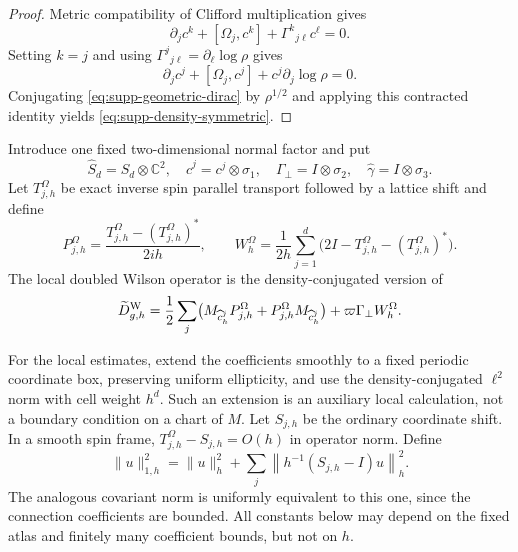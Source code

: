 \documentclass[11pt]{article}
\theoremstyle{definition}
\theoremstyle{remark}
\theoremstyle{definition}
\theoremstyle{remark}
\begin{document}
\begin{proof}
Metric compatibility of Clifford multiplication gives
\[
\partial_jc^k+[\Omega_j,c^k]+\Gamma^k{}_{j\ell}c^\ell=0.
\]
Setting $k=j$ and using
$\Gamma^j{}_{j\ell}=\partial_\ell\log\rho$ gives
\[
\partial_jc^j+[\Omega_j,c^j]+c^j\partial_j\log\rho=0.
\]
Conjugating \eqref{eq:supp-geometric-dirac} by $\rho^{1/2}$ and applying this
contracted identity yields \eqref{eq:supp-density-symmetric}.
\end{proof}

Introduce one fixed two-dimensional normal factor and put
\begin{equation}
\widehat S_d=S_d\otimes\mathbb C^2,
\quad
\widehat c^j=c^j\otimes\sigma_1,
\quad
\Gamma_\perp=I\otimes\sigma_2,
\quad
\widehat\gamma=I\otimes\sigma_3.
\label{eq:supp-doubled-clifford}
\end{equation}
Let $T_{j,h}^{\Omega}$ be exact inverse spin parallel transport followed by a lattice
shift and define
\begin{equation}
P_{j,h}^{\Omega}
=\frac{T_{j,h}^{\Omega}-(T_{j,h}^{\Omega})^*}{2ih},
\qquad
W_h^{\Omega}
=\frac1{2h}\sum_{j=1}^d
\bigl(2I-T_{j,h}^{\Omega}-(T_{j,h}^{\Omega})^*\bigr).
\label{eq:supp-covariant-differences}
\end{equation}
The local doubled Wilson operator is the density-conjugated version of
\begin{equation}
\widetilde D_{g,h}^{\rm W}
=\frac12\sum_j
\bigl(M_{\widehat c_h^j}P_{j,h}^{\Omega}
      +P_{j,h}^{\Omega}M_{\widehat c_h^j}\bigr)
+\varpi\Gamma_\perp W_h^{\Omega}.
\label{eq:supp-general-Wilson}
\end{equation}

For the local estimates, extend the coefficients smoothly to a fixed periodic
coordinate box, preserving uniform ellipticity, and use the density-conjugated
$\ell^2$ norm with cell weight $h^d$.  Such an extension is an auxiliary local
calculation, not a boundary condition on a chart of $M$.  Let $S_{j,h}$ be the
ordinary coordinate shift.  In a smooth spin frame,
$T_{j,h}^{\Omega}-S_{j,h}=O(h)$ in operator norm.  Define
\begin{equation}
 \|u\|_{1,h}^2=\|u\|_h^2+
       \sum_j\left\|h^{-1}(S_{j,h}-I)u\right\|_h^2.
 \label{eq:discrete-H1-norm}
\end{equation}
The analogous covariant norm is uniformly equivalent to this one, since the
connection coefficients are bounded.  All constants below may depend on the
fixed atlas and finitely many coefficient bounds, but not on $h$.
\end{document}

